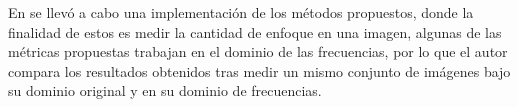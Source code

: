 En \citet{Subbarao1993} se llevó a cabo una implementación de los métodos propuestos, donde la finalidad de estos es medir la cantidad de enfoque en una imagen, algunas de las métricas propuestas trabajan en el dominio de las frecuencias, por lo que el autor compara los resultados obtenidos tras medir un mismo conjunto de imágenes bajo su dominio original y en su dominio de frecuencias.






















